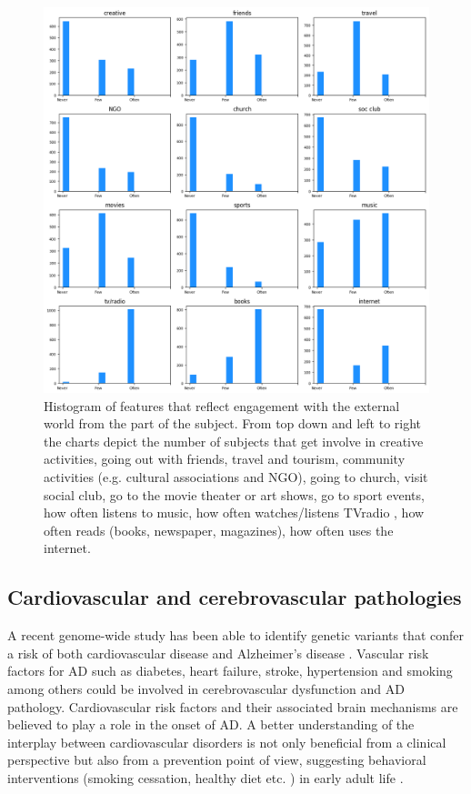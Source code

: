 \documentclass[11pt]{article}
\theoremstyle{definition}
\theoremstyle{remark}
\begin{document}
\begin{figure}[H]
        \centering
        \includegraphics[keepaspectratio, width=\linewidth]{figures/Fig_engage}
        \caption{Histogram of features that reflect engagement with the external world from the part of the subject. From top down and left to right the charts depict the number of subjects that get involve in creative activities, going out with friends, travel and tourism, community activities (e.g. cultural associations and NGO), going to church, visit social club, go to the movie theater or art shows, go to sport events, how often listens to music, how often watches/listens TVradio , how often reads (books, newspaper, magazines), how often uses the internet.} 
        \label{fig:engage}
\end{figure}


\subsection{Cardiovascular and cerebrovascular pathologies}
\label{ssse:cardio}

A recent genome-wide study has been able to identify genetic variants that confer a risk of both cardiovascular disease and Alzheimer's disease \cite{broce2019dissecting}. Vascular risk factors for AD such as diabetes, heart failure, stroke, hypertension and smoking among others could be involved in cerebrovascular dysfunction and AD pathology. Cardiovascular risk factors and their associated brain mechanisms are believed to play a role in the onset of AD. 
A better understanding of the interplay between cardiovascular disorders is not only beneficial from a clinical perspective but also from a prevention point of view, suggesting behavioral interventions (smoking cessation, healthy diet etc. ) in early adult life \cite{de2010cardiac}.  
\end{document}
